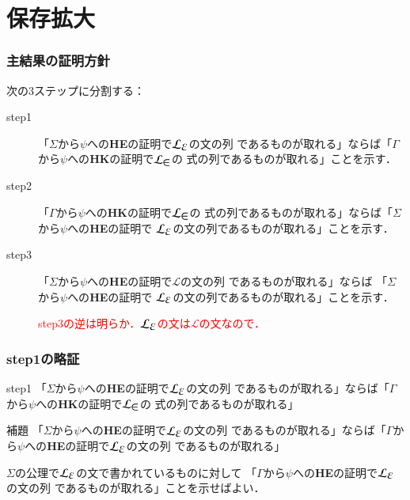 \documentclass[dvipdfmx,10pt,notheorems]{beamer}
\theoremstyle{definition}
\newcommand{\lang}[1]{\mathcal{L}_{\scalebox{1.2}{$#1$}}} %
\begin{document}
\section{保存拡大}
\begin{frame}\frametitle{主結果の証明方針}
	次の3ステップに分割する：
	\begin{description}
		\item[step1]  「$\Sigma$から$\psi$への{\bf HE}の証明で$\lang{\varepsilon}$の文の列
			であるものが取れる」ならば「$\Gamma$から$\psi$への{\bf HK}の証明で$\lang{\in}$の
			式の列であるものが取れる」ことを示す．
		
		\item[step2] 「$\Gamma$から$\psi$への{\bf HK}の証明で$\lang{\in}$の
			式の列であるものが取れる」ならば「$\Sigma$から$\psi$への{\bf HE}の証明で
			$\lang{\varepsilon}$の文の列であるものが取れる」ことを示す．
		
		\item[step3] 「$\Sigma$から$\psi$への{\bf HE}の証明で$\mathcal{L}$の文の列
			であるものが取れる」ならば 「$\Sigma$から$\psi$への{\bf HE}の証明で
			$\lang{\varepsilon}$の文の列であるものが取れる」ことを示す．
			
			\textcolor{red}{step3の逆は明らか．$\lang{\varepsilon}$の文は$\mathcal{L}$の文なので．}
	\end{description}
\end{frame}

\begin{frame}\frametitle{step1の略証}
	\begin{block}{step1}
		「$\Sigma$から$\psi$への{\bf HE}の証明で$\lang{\varepsilon}$の文の列
		であるものが取れる」ならば「$\Gamma$から$\psi$への{\bf HK}の証明で$\lang{\in}$の
		式の列であるものが取れる」
	\end{block}
	
	\begin{block}{補題}
		「$\Sigma$から$\psi$への{\bf HE}の証明で$\lang{\varepsilon}$の文の列
		であるものが取れる」ならば「$\Gamma$から$\psi$への{\bf HE}の証明で$\lang{\varepsilon}$の文の列
		であるものが取れる」
	\end{block}
	
	$\Sigma$の公理で$\lang{\varepsilon}$の文で書かれているものに対して
	「$\Gamma$から$\psi$への{\bf HE}の証明で$\lang{\varepsilon}$の文の列
	であるものが取れる」ことを示せばよい．
\end{frame}
\end{document}
